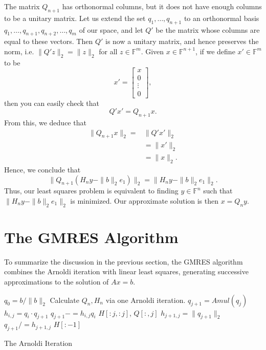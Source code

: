 The matrix $Q_{n+1}$ has orthonormal columns, but it does not have enough columns to be a unitary matrix.  
Let us extend the set $q_1,\ldots, q_{n+1}$ to an orthonormal basis $q_1,\ldots,q_{n+1},q_{n+2},\ldots,q_m$
of our space, and let $Q'$ be the matrix whose columns are equal to these vectors.
Then $Q'$ is now a unitary matrix, and hence preserves the norm, i.e. $\|Q'z\|_2 = \|z\|_2$ for all $z \in \mathbb{F}^m$. 
Given $x \in \mathbb{F}^{n+1}$, if we define $x' \in \mathbb{F}^m$ to be 
\[
x' = 
\begin{bmatrix}
  x\\
  0\\
  \vdots\\
  0
\end{bmatrix},
\]
then you can easily check that 
\[
Q'x' = Q_{n+1}x.
\]
From this, we deduce that
\begin{align*}
\|Q_{n+1}x\|_2 =& \|Q'x'\|_2\\
& = \|x'\|_2\\
&= \|x\|_2. 
\end{align*}
Hence, we conclude that 
\[
\|Q_{n+1}\left(H_n y - \|b\|_2e_1\right)\|_2 = \|H_n y - \|b\|_2e_1\|_2.
\]
Thus, our least squares problem is equivalent to finding $y \in \mathbb{F}^n$ such that $\|H_n y - \|b\|_2e_1\|_2$ is minimized.
Our approximate solution is then $x=Q_n y$.

\section*{The GMRES Algorithm}
To summarize the discussion in the previous section, the GMRES algorithm combines the Arnoldi iteration with linear least squares,
generating successive approximations to the solution of $Ax = b$. 

\begin{algorithm}
\begin{algorithmic}[1]
	\State $q_0 = b/\|b\|_2$
        \State Calculate $Q_n, H_n$ via one Arnoldi iteration.
    \EndFor						
								
		\State $q_{j+1} = Amul \left(q_j\right)$		
							
			\State $h_{i,j} = q_i \cdot q_{j+1}$		
			\State $q_{j+1} -= h_{i,j} q_i$
		\EndFor
							
			\State {} $H[:j,:j]$, $Q[:,j]$
		\EndIf
		\State $h_{j+1,j} = \|q_{j+1}\|_2$			
		\State $q_{j+1} /= h_{j+1,j}$				
	\EndFor
	\State {} $H[:-1]$				
\EndProcedure
\end{algorithmic}
\caption{The Arnoldi Iteration}
\label{alg:arnoldi_iteration}
\end{algorithm}

